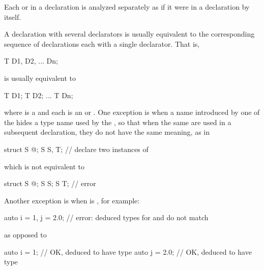 \pnum
Each  or 
in a declaration is analyzed separately as if it were in a declaration by itself.
\begin{note}
A declaration with several declarators is usually equivalent to the corresponding
sequence of declarations each with a single declarator. That is,
\begin{codeblock}
T D1, D2, ... Dn;
\end{codeblock}
is usually equivalent to
\begin{codeblock}
T D1; T D2; ... T Dn;
\end{codeblock}
where  is a 
and each  is
an  or .
One exception is when a name introduced by one of the
 hides a type name used by the
, so that when the same
 are used in a subsequent declaration,
they do not have the same meaning, as in
\begin{codeblock}
struct S { @\commentellip@ };
S S, T;                 // declare two instances of 
\end{codeblock}
which is not equivalent to
\begin{codeblock}
struct S { @\commentellip@ };
S S;
S T;                    // error
\end{codeblock}
Another exception is when  is ,
for example:
\begin{codeblock}
auto i = 1, j = 2.0;    // error: deduced types for  and  do not match
\end{codeblock}
as opposed to
\begin{codeblock}
auto i = 1;             // OK,  deduced to have type 
auto j = 2.0;           // OK,  deduced to have type 
\end{codeblock}
\end{note}

